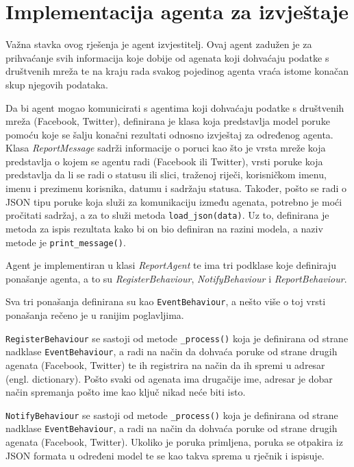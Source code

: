 \documentclass[a4paper,12pt]{foi}
\begin{document}
\section{Implementacija agenta za izvještaje}

Važna stavka ovog rješenja je agent izvjestitelj. Ovaj agent zadužen je za prihvaćanje svih informacija koje dobije od agenata koji dohvaćaju podatke s društvenih mreža te na kraju rada svakog pojedinog agenta vraća istome konačan skup njegovih podataka.

Da bi agent mogao komunicirati s agentima koji dohvaćaju podatke s društvenih mreža (Facebook, Twitter), definirana je klasa koja predstavlja model poruke pomoću koje se šalju konačni rezultati odnosno izvještaj za određenog agenta.
Klasa \textit{ReportMessage} sadrži informacije o poruci kao što je vrsta mreže koja predstavlja o kojem se agentu radi (Facebook ili Twitter), vrsti poruke koja predstavlja da li se radi o statusu ili slici, traženoj riječi, korisničkom imenu, imenu i prezimenu korisnika, datumu i sadržaju statusa.
Također, pošto se radi o JSON tipu poruke koja služi za komunikaciju između agenata, potrebno je moći pročitati sadržaj, a za to služi metoda \texttt{load\_json(data)}. Uz to, definirana je metoda za ispis rezultata kako bi on bio definiran na razini modela, a naziv metode je \texttt{print\_message()}.

\lstset{commentstyle=\textit,language=python}


Agent je implementiran u klasi \textit{ReportAgent} te ima tri podklase koje definiraju ponašanje agenta, a to su \textit{RegisterBehaviour}, \textit{NotifyBehaviour} i \textit{ReportBehaviour}.

Sva tri ponašanja definirana su kao \texttt{EventBehaviour}, a nešto više o toj vrsti ponašanja rečeno je u ranijim poglavljima.

\texttt{RegisterBehaviour} se sastoji od metode \texttt{\_process()} koja je definirana od strane nadklase \texttt{EventBehaviour}, a radi na način da dohvaća poruke od strane drugih agenata (Facebook, Twitter) te ih registrira na način da ih spremi u adresar (engl. dictionary). Pošto svaki od agenata ima drugačije ime, adresar je dobar način spremanja pošto ime kao ključ nikad neće biti isto.

\texttt{NotifyBehaviour} se sastoji od metode \texttt{\_process()} koja je definirana od strane nadklase \texttt{EventBehaviour}, a radi na način da dohvaća poruke od strane drugih agenata (Facebook, Twitter). Ukoliko je poruka primljena, poruka se otpakira iz JSON formata u određeni model te se kao takva sprema u rječnik i ispisuje.
\end{document}
